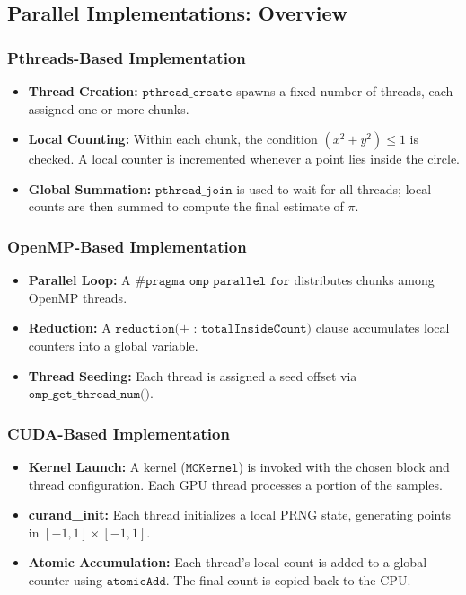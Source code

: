 \documentclass[12pt]{article}
\begin{document}
\subsection{Parallel Implementations: Overview}
\subsubsection{Pthreads-Based Implementation}
\begin{itemize}
      \item \textbf{Thread Creation:} \(\texttt{pthread\_create}\) spawns a fixed number of
            threads, each assigned one or more chunks.
      \item \textbf{Local Counting:} Within each chunk, the condition
            \((x^2 + y^2) \le 1\) is checked. A local counter is incremented whenever a point
            lies inside the circle.
      \item \textbf{Global Summation:} \(\texttt{pthread\_join}\) is used to wait for all
            threads; local counts are then summed to compute the final estimate of \(\pi\).
\end{itemize}

\subsubsection{OpenMP-Based Implementation}
\begin{itemize}
      \item \textbf{Parallel Loop:} A \(\texttt{\#pragma omp parallel for}\) distributes
            chunks among OpenMP threads.
      \item \textbf{Reduction:} A \(\texttt{reduction(+ : totalInsideCount)}\) clause
            accumulates local counters into a global variable.
      \item \textbf{Thread Seeding:} Each thread is assigned a seed offset via
            \(\texttt{omp\_get\_thread\_num()}\).
\end{itemize}

\subsubsection{CUDA-Based Implementation}
\begin{itemize}
      \item \textbf{Kernel Launch:} A kernel (\(\texttt{MCKernel}\)) is invoked with the chosen
            block and thread configuration. Each GPU thread processes a portion of the samples.
      \item \textbf{curand\_init:} Each thread initializes a local PRNG state, generating points
            in \([-1,1]\times[-1,1]\).
      \item \textbf{Atomic Accumulation:} Each thread’s local count is added to a global counter
            using \(\texttt{atomicAdd}\). The final count is copied back to the CPU.\@
\end{itemize}
\end{document}
